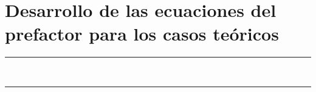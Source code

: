 \pagestyle{plain}
\chapter{Desarrollo de las ecuaciones del prefactor para los casos teóricos}\label{app:ApendiceII}
\vspace{0.2cm}
\noindent\rule{\linewidth}{1.5pt}\\
\startcontents[chapters]
\vspace{0.2cm}
\noindent\rule{\linewidth}{1.3pt}\\
\newpage
